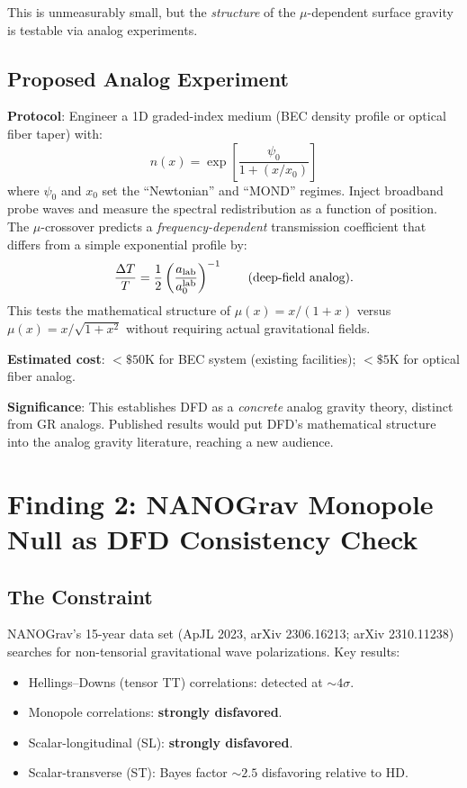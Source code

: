 \documentclass[11pt]{article}
\begin{document}
This is unmeasurably small, but the \emph{structure} of the
$\mu$-dependent surface gravity is testable via analog experiments.

\subsection{Proposed Analog Experiment}

\textbf{Protocol}: Engineer a 1D graded-index medium (BEC density
profile or optical fiber taper) with:
\begin{equation}
n(x) = \exp\left[\frac{\psi_0}{1 + (x/x_0)}\right]
\end{equation}
where $\psi_0$ and $x_0$ set the ``Newtonian'' and ``MOND'' regimes.
Inject broadband probe waves and measure the spectral redistribution
as a function of position. The $\mu$-crossover predicts a
\emph{frequency-dependent} transmission coefficient that differs from
a simple exponential profile by:
\begin{equation}
\frac{\Delta T}{T} = \frac{1}{2}\left(\frac{a_{\rm lab}}{a_0^{\rm lab}}\right)^{-1}
\qquad \text{(deep-field analog)}.
\end{equation}
This tests the mathematical structure of $\mu(x) = x/(1+x)$ versus
$\mu(x) = x/\sqrt{1+x^2}$ without requiring actual gravitational
fields.

\textbf{Estimated cost}: $<\$50\text{K}$ for BEC system (existing
facilities); $<\$5\text{K}$ for optical fiber analog.

\textbf{Significance}: This establishes DFD as a \emph{concrete}
analog gravity theory, distinct from GR analogs. Published results
would put DFD's mathematical structure into the analog gravity
literature, reaching a new audience.


\section{Finding 2: NANOGrav Monopole Null as DFD Consistency Check}
\label{sec:PTA}

\subsection{The Constraint}

NANOGrav's 15-year data set (ApJL 2023, arXiv 2306.16213; arXiv
2310.11238) searches for non-tensorial gravitational wave polarizations.
Key results:
\begin{itemize}[nosep]
\item Hellings--Downs (tensor TT) correlations: detected at $\sim 4\sigma$.
\item Monopole correlations: \textbf{strongly disfavored}.
\item Scalar-longitudinal (SL): \textbf{strongly disfavored}.
\item Scalar-transverse (ST): Bayes factor $\sim 2.5$ disfavoring
  relative to HD.
\end{itemize}
\end{document}
